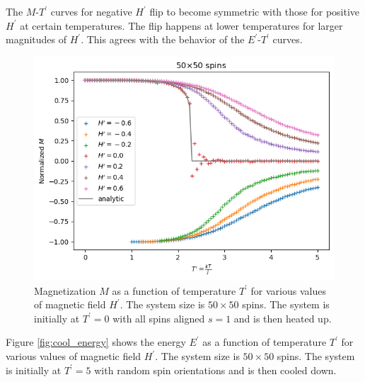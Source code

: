 \documentclass[11pt]{article}
\begin{document}
The $M$-$T^\prime$ curves for negative $H^\prime$ flip to become symmetric with those for positive $H^\prime$ at certain temperatures. The flip happens at lower temperatures for larger magnitudes of $H^\prime$. This agrees with the behavior of the $E^\prime$-$T^\prime$ curves.
\begin{figure}[H]
    \centering
    \includegraphics[scale = 0.7]{Figs_TW/magnetization_N50.png}
    \caption{Magnetization $M$ as a function of temperature $T^\prime$ for various values of magnetic field $H^\prime$. The system size is $50 \times 50$ spins. The system is initially at $T^\prime = 0$ with all spins aligned $s=1$ and is then heated up.}
    \label{fig:magnetization}
\end{figure}

Figure \ref{fig:cool_energy} shows the energy $E^\prime$ as a function of temperature $T^\prime$ for various values of magnetic field $H^\prime$. The system size is $50 \times 50$ spins. The system is initially at $T^\prime = 5$ with random spin orientations and is then cooled down.
\end{document}
